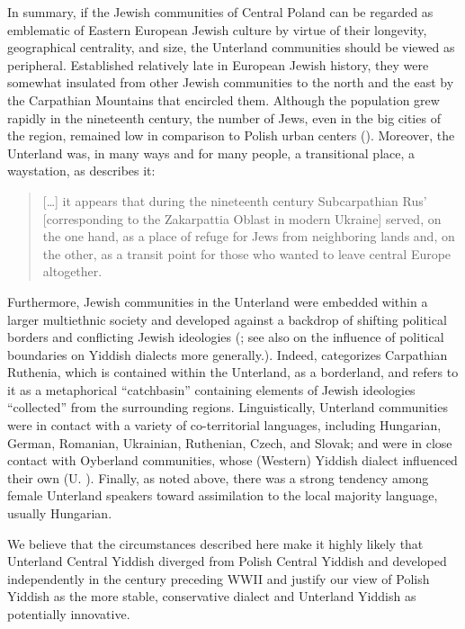\documentclass[output=paper,colorlinks,citecolor=brown]{langscibook}
\begin{document}
In summary, if the Jewish communities of Central Poland can be regarded as emblematic of Eastern European Jewish culture by virtue of their longevity, geographical centrality, and size, the Unterland communities should be viewed as peripheral. Established relatively late in European Jewish history, they were somewhat insulated from other Jewish communities to the north and the east by the Carpathian Mountains that encircled them. Although the population grew rapidly in the nineteenth century, the number of Jews, even in the big cities of the region, remained low in comparison to Polish urban centers (\citealt[13]{Jelinek2007}). Moreover, the Unterland was, in many ways and for many people, a transitional place, a waystation, as \citet[34]{Jelinek2007} describes it:

\begin{quote}
[…] it appears that during the nineteenth century Subcarpathian Rus' [corresponding to the Zakarpattia Oblast in modern Ukraine] served, on the one hand, as a place of refuge for Jews from neighboring lands and, on the other, as a transit point for those who wanted to leave central Europe altogether. 
\end{quote}

Furthermore, Jewish communities in the Unterland were embedded within a larger multiethnic society and developed against a backdrop of shifting political borders and conflicting Jewish ideologies (\citealt{Keren-Kratz2019,Cooper2019,Jelinek2007,Švorc2020}; see also \citealt{Schäfer2022} on the influence of political boundaries on Yiddish dialects more generally.). Indeed, \citet[200]{Cooper2019} categorizes Carpathian Ruthenia, which is contained within the Unterland, as a borderland, and refers to it as a metaphorical ``catchbasin'' containing elements of Jewish ideologies ``collected'' from the surrounding regions. Linguistically, Unterland communities were in contact with a variety of co-territorial languages, including Hungarian, German, Romanian, Ukrainian, Ruthenian, Czech, and Slovak; and were in close contact with Oyberland communities, whose (Western) Yiddish dialect influenced their own (U. \citealt{Weinreich1964}). Finally, as noted above, there was a strong tendency among female Unterland speakers toward assimilation to the local majority language, usually Hungarian.

We believe that the circumstances described here make it highly likely that Unterland Central Yiddish diverged from Polish Central Yiddish and developed independently in the century preceding WWII and justify our view of Polish Yiddish as the more stable, conservative dialect and Unterland Yiddish as potentially innovative.
\end{document}
